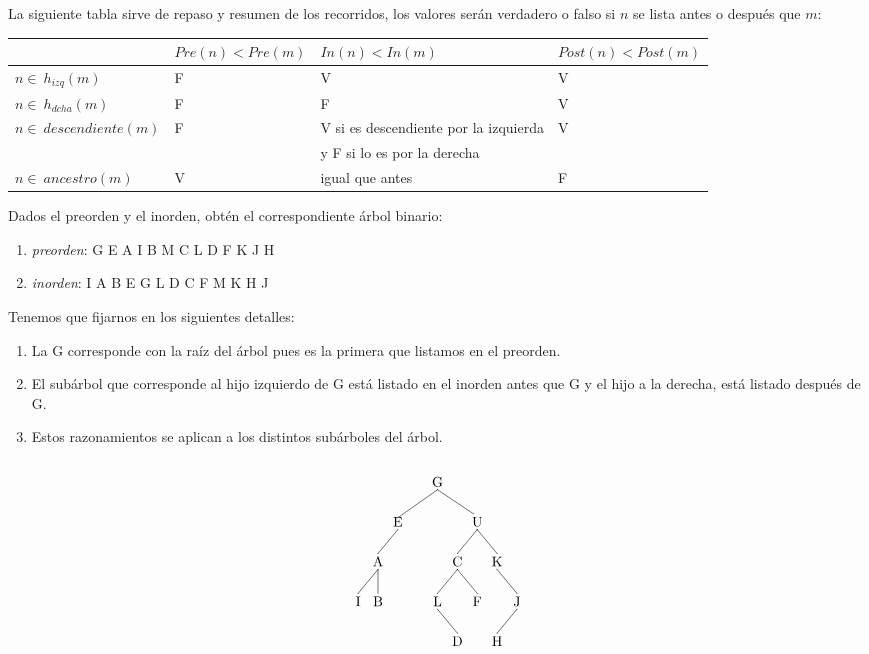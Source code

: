 \documentclass[10pt,a4paper,spanish]{report}
\begin{document}
\noindent
La siguiente tabla sirve de repaso y resumen de los recorridos, los valores serán verdadero o falso si $n$ se lista antes o después que $m$: \\[0.5cm]
\begin{tabular}{|l|| l| l| l|} 
\hline
& $Pre(n) < Pre(m)$ & $In(n) < In(m)$ & $Post(n) < Post(m)$ \\
\hline
$n\in ~h_{izq}(m)$ & F & V & V \\ \hline
$n\in ~h_{dcha}(m)$ & F & F & V \\ \hline
$n\in ~descendiente(m)$ & F & V si es descendiente por la izquierda & V \\
~                       &~  & y F si lo es por la derecha &  \\ \hline
$n\in ~ancestro(m)$ & V & igual que antes & F \\ \hline
\end{tabular} 

\noindent
Dados el preorden y el inorden, obtén el correspondiente árbol binario:
\begin{enumerate}[$\spadesuit$]
\item \textit{\textcolor[rgb]{0.3,0.4,0.8}{preorden}}: G E A I B M C L D F K J H
\item \textit{\textcolor[rgb]{0.3,0.4,0.8}{inorden}}: I A B E G L D C F M K H J
\end{enumerate}

\noindent
Tenemos que fijarnos en los siguientes detalles:
\begin{enumerate}[1.]
\item La G corresponde con la raíz del árbol pues es la primera que listamos en el preorden.
\item El subárbol que corresponde al hijo izquierdo de G está listado en el inorden antes que G y el hijo a la derecha, está listado después de G.
\item Estos razonamientos se aplican a los distintos subárboles del árbol.
\end{enumerate}

\[\begin{xy}
,(0,0)*+=<10mm>[]\txt<2cm>{G}
,(-10,-10)*+=<10mm>[]\txt<2cm>{E}
,(10,-10)*+=<10mm>[]\txt<2cm>{U}
,(-15,-20)*+=<10mm>[]\txt<2cm>{A}
,(5,-20)*+=<10mm>[]\txt<2cm>{C}
,(15,-20)*+=<10mm>[]\txt<2cm>{K}
,(0,-30)*+=<10mm>[]\txt<2cm>{L}
,(10,-30)*+=<10mm>[]\txt<2cm>{F}
,(-20,-30)*+=<10mm>[]\txt<2cm>{I}
,(-15,-30)*+=<10mm>[]\txt<2cm>{B}
,(5,-40)*+=<10mm>[]\txt<2cm>{D}
,(20,-30)*+=<10mm>[]\txt<2cm>{J}
,(15,-40)*+=<10mm>[]\txt<2cm>{H}

\ar@{-} (0,-2);(-10,-9)
\ar@{-} (0,-2);(9,-8)
\ar@{-} (-10,-12);(-15,-18)
\ar@{-} (10,-12);(5,-18)
\ar@{-} (10,-12);(15,-18)
\ar@{-} (5,-22);(0,-28)
\ar@{-} (5,-22);(10,-28)
\ar@{-} (-15,-22);(-20,-28)
\ar@{-} (-15,-22);(-15,-28)
\ar@{-} (0,-32);(5,-38)
\ar@{-} (15,-22);(20,-28)
\ar@{-} (20,-32);(15,-38)
\end{xy}\]
\end{document}
